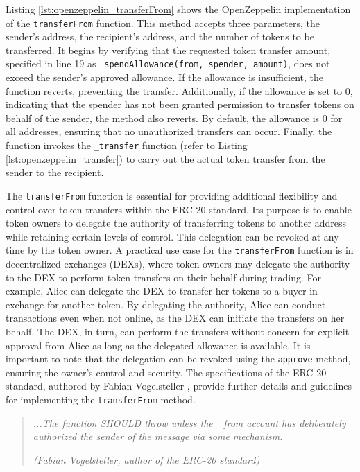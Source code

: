 Listing \ref{lst:openzeppelin_transferFrom} shows the OpenZeppelin implementation of the \texttt{transferFrom} function. This method accepts three parameters, the sender's address, the 
recipient's address, and the number of tokens to be transferred. It begins by verifying that the requested token transfer amount, specified in line 19 as \texttt{\_spendAllowance(from, spender, amount)}, 
does not exceed the sender's approved allowance. If the allowance is insufficient, the function reverts, preventing the transfer. Additionally, if the allowance is set to 0, indicating 
that the spender has not been granted permission to transfer tokens on behalf of the sender, the method also reverts. By default, the allowance is 0 for all addresses, ensuring that no 
unauthorized transfers can occur. Finally, the function invokes the \texttt{\_transfer} function (refer to Listing \ref{lst:openzeppelin_transfer}) to carry out the actual token transfer 
from the sender to the recipient.

The \texttt{transferFrom} function is essential for providing additional flexibility and control over token transfers within the ERC-20 standard. Its purpose is to enable token owners to delegate the authority of transferring tokens to another address while retaining certain levels of control. This delegation can be revoked at any time by the token owner.
A practical use case for the \texttt{transferFrom} function is in decentralized exchanges (DEXs), where token owners may delegate the authority to the DEX to perform token transfers on their behalf during trading. For example, Alice can delegate the DEX to transfer her tokens to a buyer in exchange for another token. By delegating the authority, Alice can conduct transactions even when not online, as the DEX can initiate the transfers on her behalf. The DEX, in turn, can perform the transfers without concern for explicit approval from Alice as long as the delegated allowance is available. It is important to note that the delegation can be revoked using the \texttt{approve} method, ensuring the owner's control and security.
The specifications of the ERC-20 standard, authored by Fabian Vogelsteller \cite{eth_erc20}, provide further details and guidelines for implementing the \texttt{transferFrom} method.

\begin{quote}
    \textit{...The function SHOULD throw unless the \_from account has deliberately authorized the sender of the message via some mechanism.}

    \textit{(Fabian Vogelsteller, author of the ERC-20 standard)}
\end{quote}

